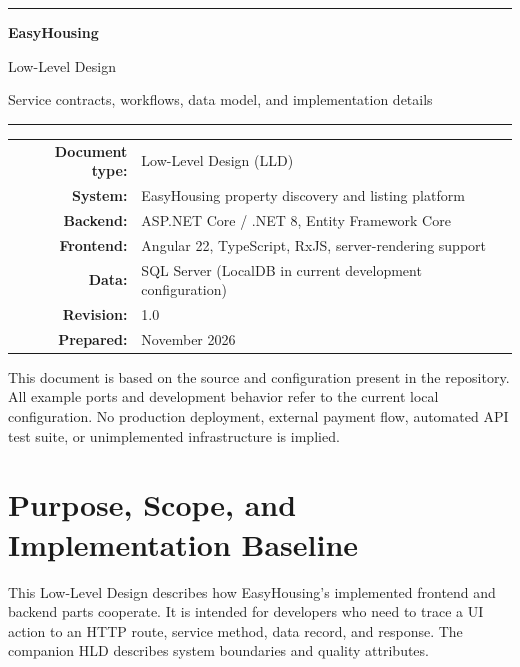 \documentclass[10pt,a4paper]{article}
\newcommand{\pagebreakdoc}{\clearpage}
\begin{document}
\begin{titlepage}
\centering
\vspace*{19mm}
{\color{ehgreen}\rule{\textwidth}{2pt}}\par
\vspace{12mm}
{\Huge\bfseries EasyHousing\par}
\vspace{4mm}
{\LARGE Low-Level Design\par}
\vspace{5mm}
{\large\color{ehgray}Service contracts, workflows, data model, and implementation details}\par
\vspace{13mm}
{\color{ehgreen}\rule{0.62\textwidth}{1pt}}\par
\vspace{16mm}
\begin{tabular}{rl}
\textbf{Document type:} & Low-Level Design (LLD)\\
\textbf{System:} & EasyHousing property discovery and listing platform\\
\textbf{Backend:} & ASP.NET Core / .NET 8, Entity Framework Core\\
\textbf{Frontend:} & Angular 22, TypeScript, RxJS, server-rendering support\\
\textbf{Data:} & SQL Server (LocalDB in current development configuration)\\
\textbf{Revision:} & 1.0\\
\textbf{Prepared:} & November 2026\\
\end{tabular}
\vfill
\begin{minipage}{0.88\textwidth}
\small\color{ehgray}
This document is based on the source and configuration present in the repository.
All example ports and development behavior refer to the current local configuration.
No production deployment, external payment flow, automated API test suite, or
unimplemented infrastructure is implied.
\end{minipage}
\vspace{8mm}
\end{titlepage}

\tableofcontents
\pagebreakdoc

\section{Purpose, Scope, and Implementation Baseline}
This Low-Level Design describes how EasyHousing's implemented frontend and backend
parts cooperate. It is intended for developers who need to trace a UI action to an
HTTP route, service method, data record, and response. The companion HLD describes
system boundaries and quality attributes.
\end{document}
